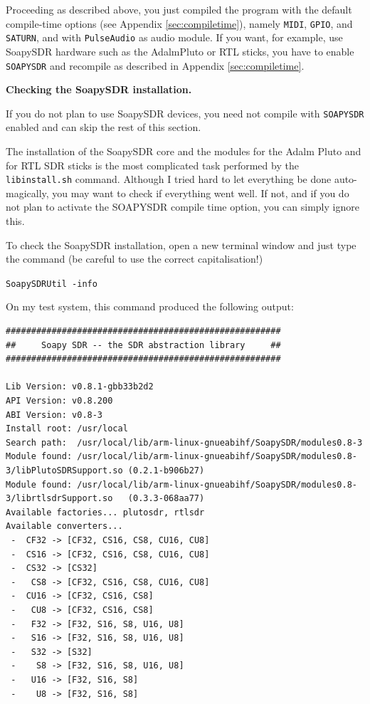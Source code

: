 \documentclass[12pt]{book}
\def\grtt#1{\texttt{\color{magenta}#1}}
\begin{document}
Proceeding as described above,  you  just compiled the program with
the default compile-time options (see Appendix \ref{sec:compiletime}), namely
\texttt{MIDI}, \texttt{GPIO}, and \texttt{SATURN}, and with \texttt{PulseAudio}
as audio module. If you want, for example, use SoapySDR hardware such as the AdalmPluto
or RTL sticks, you have to enable \texttt{SOAPYSDR} and recompile as described in
Appendix \ref{sec:compiletime}.


\textbf{Checking the SoapySDR installation.}

If you do not plan to use SoapySDR devices, you need not compile with \texttt{SOAPYSDR}
enabled and can skip the rest of this section.

The installation of the SoapySDR core and the modules for the Adalm Pluto and for RTL SDR
sticks is the most complicated task performed by the \texttt{libinstall.sh} command.
Although I tried hard to let everything be done auto-magically, you may want to check
if everything went well. If not, and if you do not plan to activate the SOAPYSDR compile time
option, you can simply ignore this.

\clearpage
To check the SoapySDR installation, open a new terminal
window and just type the command (be careful to use the correct capitalisation!)

\grtt{SoapySDRUtil -info}

On my test system, this command produced the following output:

\begin{tiny}
\begin{verbatim}
######################################################
##     Soapy SDR -- the SDR abstraction library     ##
######################################################

Lib Version: v0.8.1-gbb33b2d2
API Version: v0.8.200
ABI Version: v0.8-3
Install root: /usr/local
Search path:  /usr/local/lib/arm-linux-gnueabihf/SoapySDR/modules0.8-3
Module found: /usr/local/lib/arm-linux-gnueabihf/SoapySDR/modules0.8-3/libPlutoSDRSupport.so (0.2.1-b906b27)
Module found: /usr/local/lib/arm-linux-gnueabihf/SoapySDR/modules0.8-3/librtlsdrSupport.so   (0.3.3-068aa77)
Available factories... plutosdr, rtlsdr
Available converters...
 -  CF32 -> [CF32, CS16, CS8, CU16, CU8]
 -  CS16 -> [CF32, CS16, CS8, CU16, CU8]
 -  CS32 -> [CS32]
 -   CS8 -> [CF32, CS16, CS8, CU16, CU8]
 -  CU16 -> [CF32, CS16, CS8]
 -   CU8 -> [CF32, CS16, CS8]
 -   F32 -> [F32, S16, S8, U16, U8]
 -   S16 -> [F32, S16, S8, U16, U8]
 -   S32 -> [S32]
 -    S8 -> [F32, S16, S8, U16, U8]
 -   U16 -> [F32, S16, S8]
 -    U8 -> [F32, S16, S8]
\end{verbatim}
\end{tiny}
\end{document}
